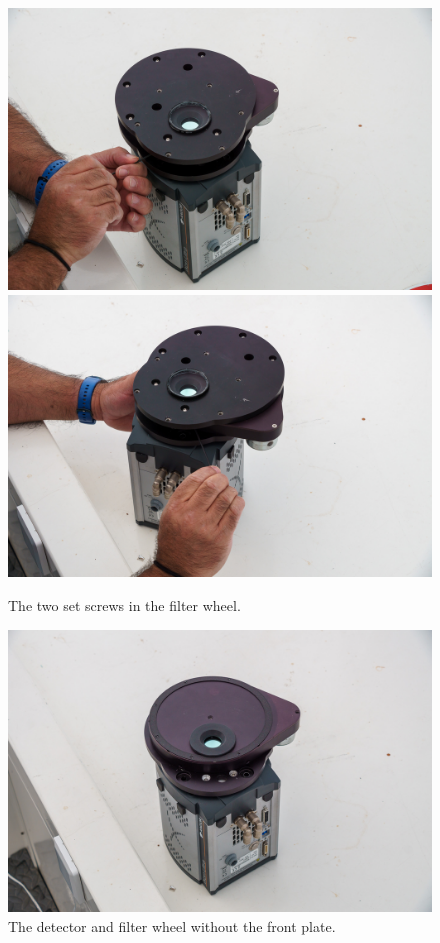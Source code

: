 \begin{figure}
\begin{center}
\includegraphics[width=0.8\linewidth]{figures/huitzi-f8-set-screws-a.jpg}
\includegraphics[width=0.8\linewidth]{figures/huitzi-f8-set-screws-b.jpg}
\end{center}
\caption{The two set screws in the filter wheel.}
\label{figure:huitzi-f8-set-screws}
\end{figure}


\begin{figure}
\begin{center}
\includegraphics[width=0.8\linewidth]{figures/huitzi-f8-without-front-plate.jpg}
\end{center}
\caption{The detector and filter wheel without the front plate.}
\label{figure:huitzi-f8-without-front-plate}
\end{figure}

